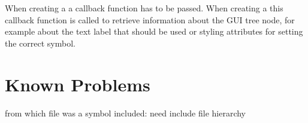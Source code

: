 When creating a  a callback function has to be passed. When creating a  this callback function is called to retrieve information about the GUI tree node, for example about the text label that should be used or styling attributes for setting the correct symbol.

\section{Known Problems}

from which file was a symbol included: need include file hierarchy


